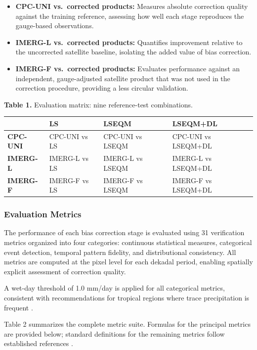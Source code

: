 \documentclass[11pt,a4paper]{article}
\providecommand{\tightlist}{\setlength{\itemsep}{0pt}\setlength{\parskip}{0pt}}
\begin{document}
\begin{itemize}
\tightlist
\item
  \textbf{CPC-UNI vs.~corrected products:} Measures absolute correction
  quality against the training reference, assessing how well each stage
  reproduces the gauge-based observations.
\item
  \textbf{IMERG-L vs.~corrected products:} Quantifies improvement
  relative to the uncorrected satellite baseline, isolating the added
  value of bias correction.
\item
  \textbf{IMERG-F vs.~corrected products:} Evaluates performance against
  an independent, gauge-adjusted satellite product that was not used in
  the correction procedure, providing a less circular validation.
\end{itemize}

\textbf{Table 1.} Evaluation matrix: nine reference-test combinations.

\begingroup\small
\begin{longtable}[]{@{}llll@{}}
\toprule
& \textbf{LS} & \textbf{LSEQM} & \textbf{LSEQM+DL} \\
\midrule
\endhead
\bottomrule
\endlastfoot
\textbf{CPC-UNI} & CPC-UNI vs LS & CPC-UNI vs LSEQM & CPC-UNI vs
LSEQM+DL \\
\textbf{IMERG-L} & IMERG-L vs LS & IMERG-L vs LSEQM & IMERG-L vs
LSEQM+DL \\
\textbf{IMERG-F} & IMERG-F vs LS & IMERG-F vs LSEQM & IMERG-F vs
LSEQM+DL \\
\end{longtable}
\endgroup

\subsubsection{Evaluation Metrics}\label{evaluation-metrics}

The performance of each bias correction stage is evaluated using 31
verification metrics organized into four categories: continuous
statistical measures, categorical event detection, temporal pattern
fidelity, and distributional consistency. All metrics are computed at
the pixel level for each dekadal period, enabling spatially explicit
assessment of correction quality.

A wet-day threshold of 1.0 mm/day is applied for all categorical
metrics, consistent with recommendations for tropical regions where
trace precipitation is frequent \cite{ref24}.

Table 2 summarizes the complete metric suite. Formulas for the principal
metrics are provided below; standard definitions for the remaining
metrics follow established references \cite{ref14,ref15}.
\end{document}
